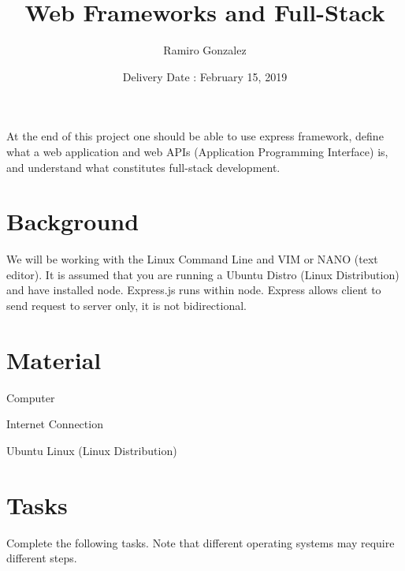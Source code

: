 \documentclass[12pt]{article}
\begin{document}
\title{Web Frameworks and Full-Stack}
\author{Ramiro Gonzalez}
\date{Delivery Date : February 15, 2019}

\maketitle

\begin{Objective}
	At the end of this project one should be able to use express framework, define what a web application and web APIs (Application Programming Interface) is, and understand what constitutes full-stack development. 
\end{Objective}

\section*{Background}
  We will be working with the Linux Command Line and VIM or NANO (text editor). It is assumed that you are running a Ubuntu Distro (Linux Distribution) and have installed node. Express.js runs within node. Express allows client to send request to server only, it is not bidirectional. 
\section*{Material}
 \color{black}
\begin{todolist}
    \item Computer 
    \item Internet Connection
    \item Ubuntu Linux (Linux Distribution) 
\end{todolist}
\section{Tasks}
Complete the following tasks. Note that different operating systems may require different steps. 
\end{document}

